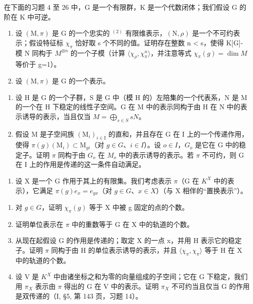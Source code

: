 在下面的习题 4 至 26 中，G 是一个有限群，K 是一个代数闭体；我们假设 G 的阶在 K 中可逆。

\begin{enumerate}
\def\labelenumi{\arabic{enumi})}
\setcounter{enumi}{3}
\item
  设 \((\mathrm{M},\pi)\) 是 G 的一个忠实的 \(^{(2)}\) 有限维表示，\((\mathrm{N},\rho)\) 是一个不可约表示；假设特征标 \(\chi_{\pi}\) 恰好取 s 个不同的值。证明存在整数 n \textless{} s，使得 K{[}G{]}-模 N 同构于 \(M^{\otimes n}\) 的一个子模（计算 \(\langle\chi_{\rho},\chi_{\pi}^{n}\rangle\)，并注意等式 \(\chi_{\pi}(g)=\dim M\) 等价于 g=1）。
\item
  设 \((\mathrm{M},\pi)\) 是 G 的一个表示。
\end{enumerate}

\begin{enumerate}
\def\labelenumi{\alph{enumi})}
\item
  设 H 是 G 的一个子群，S 是 G 中（模 H 的）左陪集的一个代表系，N 是 M 的一个在 H 下稳定的线性子空间。G 在 M 中的表示同构于由 H 在 N 中的表示诱导的表示，当且仅当 \(M = \bigoplus_{s \in S} sN\)。
\item
  假设 M 是子空间族 \((\mathrm{M}_{i})_{i\in\mathrm{I}}\) 的直和，并且存在 G 在 I 上的一个传递作用，使得 \(\pi(g)(\mathrm{M}_{i})\subset\mathrm{M}_{gi}\)（对 \(g\in G\)、\(i\in I\)）。设 \(o\in I\)，\(G_{o}\) 是它在 G 中的稳定子。证明 \(\pi\) 同构于由 \(G_{o}\) 在 \(M_{o}\) 中的表示诱导的表示。若 \(\pi\) 不可约，则 G 在 I 上的作用是传递的这一条件自动满足。
\end{enumerate}

\begin{enumerate}
\def\labelenumi{\arabic{enumi})}
\setcounter{enumi}{5}
\tightlist
\item
  设 X 是一个 G 作用于其上的有限集。我们考虑表示 \(\pi\)（G 在 \(K^{X}\) 中的表示），它满足 \(\pi(g)e_{x}=e_{gx}\)（对 \(g\in G\)、\(x\in X\)）（与 X 相伴的“置换表示”）。
\end{enumerate}

\begin{enumerate}
\def\labelenumi{\alph{enumi})}
\item
  对 \(g \in G\)，证明 \(\chi_{\pi}(g)\) 等于 X 中被 g 固定的点的个数。
\item
  证明单位表示在 \(\pi\) 中的重数等于 G 在 X 中的轨道的个数。
\item
  从现在起假设 G 的作用是传递的；取定 X 的一点 x，并用 H 表示它的稳定子。证明 \(\pi\) 同构于由 H 的单位表示诱导的表示，并且 \(\langle\chi_{\pi},\chi_{\pi}\rangle\) 等于 H 在 X 中的轨道的个数。
\item
  设 V 是 \(K^{X}\) 中由诸坐标之和为零的向量组成的子空间；它在 G 下稳定，我们用 \(\pi_{X}\) 表示由 \(\pi\) 得出的 G 在 V 中的表示。证明 \(\pi_{X}\) 不可约当且仅当 G 的作用是双传递的（I, §5, 第 143 页，习题 14）。
\end{enumerate}

